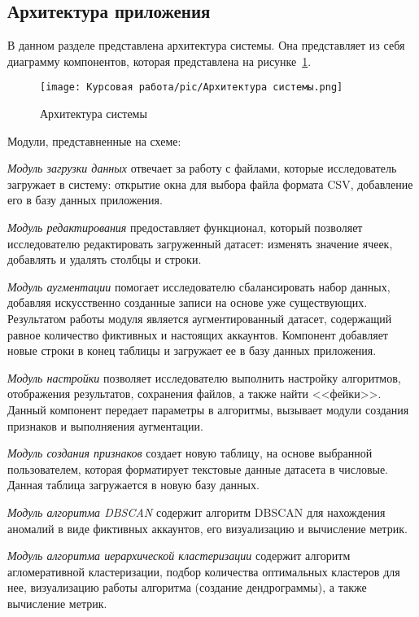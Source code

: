 \subsection{Архитектура приложения}
\label{subsec:Architecture}
В данном разделе представлена архитектура системы. Она представляет из себя диаграмму компонентов, которая представлена на рисунке~\ref{ris:arch}.

\begin{figure}[ht]
    \texttt{[image: Курсовая работа/pic/Архитектура системы.png]}
    \caption{Архитектура системы}
    \label{ris:arch}
\end{figure}

Модули, представненные на схеме:

\textit{Модуль загрузки данных} отвечает за работу с файлами, которые исследователь загружает в систему: открытие окна для выбора файла формата CSV, добавление его в базу данных приложения.


\textit{Модуль редактирования} предоставляет функционал, который позволяет исследователю редактировать загруженный датасет: изменять значение ячеек, добавлять и удалять столбцы и строки.


\textit{Модуль аугментации} помогает исследователю сбалансировать набор данных, добавляя искусственно созданные записи на основе уже существующих. Результатом работы модуля является аугментированный датасет, содержащий равное количество фиктивных и настоящих аккаунтов. Компонент добавляет новые строки в конец таблицы и загружает ее в базу данных приложения.


\textit{Модуль настройки} позволяет исследователю выполнить настройку алгоритмов, отображения результатов, сохранения файлов, а также найти <<фейки>>. Данный компонент передает параметры в алгоритмы, вызывает модули создания признаков и выполняения аугментации.


\textit{Модуль создания признаков} создает новую таблицу, на основе выбранной пользователем, которая форматирует текстовые данные датасета в числовые. Данная таблица загружается в новую базу данных.


\textit{Модуль алгоритма DBSCAN} содержит алгоритм DBSCAN для нахождения аномалий в виде фиктивных аккаунтов, его визуализацию и вычисление метрик.


\textit{Модуль алгоритма иерархической кластеризации} содержит алгоритм агломеративной кластеризации, подбор количества оптимальных кластеров для нее, визуализацию работы алгоритма (создание дендрограммы), а также вычисление метрик.


